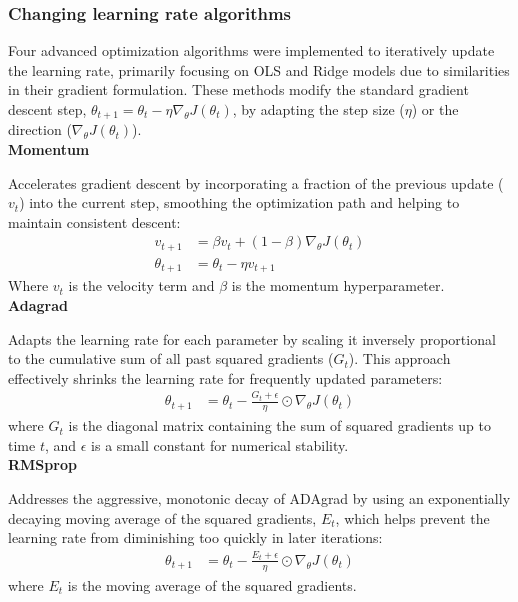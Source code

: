 \documentclass[twocolumn,aps]{revtex4}
\begin{document}
\subsubsection{Changing learning rate algorithms}
Four advanced optimization algorithms were implemented to iteratively update the learning rate, primarily focusing on OLS and Ridge models due to similarities in their gradient formulation.
These methods modify the standard gradient descent step, $\theta_{t+1}=\theta_t-\eta\nabla_{\theta} J(\theta_t)$, by adapting the step size ($\eta$) or the direction ($\nabla_{\theta} J(\theta_t)$).
\\ 

\textbf{Momentum}

Accelerates gradient descent by incorporating a fraction of the previous update ($v_t$) into the current step, smoothing the optimization path and helping to maintain consistent descent:
\begin{align*}
v_{t+1} &= \beta v_t + (1 - \beta) \nabla_{\theta} J(\theta_t) \\
\theta_{t+1} &= \theta_t - \eta v_{t+1}
\end{align*}
Where $v_t$ is the velocity term and $\beta$ is the momentum hyperparameter.
\\

\textbf{Adagrad}

Adapts the learning rate for each parameter by scaling it inversely proportional to the cumulative sum of all past squared gradients ($G_t$). This approach effectively shrinks the learning rate for frequently updated parameters:
\begin{align*}
\theta_{t+1} &= \theta_t - \frac{G_t + \epsilon}{\eta} \odot \nabla_{\theta} J(\theta_t)
\end{align*}
where $G_t$ is the diagonal matrix containing the sum of squared gradients up to time $t$, and $\epsilon$ is a small constant for numerical stability.
\\

\textbf{RMSprop}

Addresses the aggressive, monotonic decay of ADAgrad by using an exponentially decaying moving average of the squared gradients, $E_t$, which helps prevent the learning rate from diminishing too quickly in later iterations:
\begin{align*}
\theta_{t+1} &= \theta_t - \frac{E_t + \epsilon}{\eta} \odot \nabla_{\theta} J(\theta_t)
\end{align*}
where $E_t$ is the moving average of the squared gradients.
\\
\end{document}
